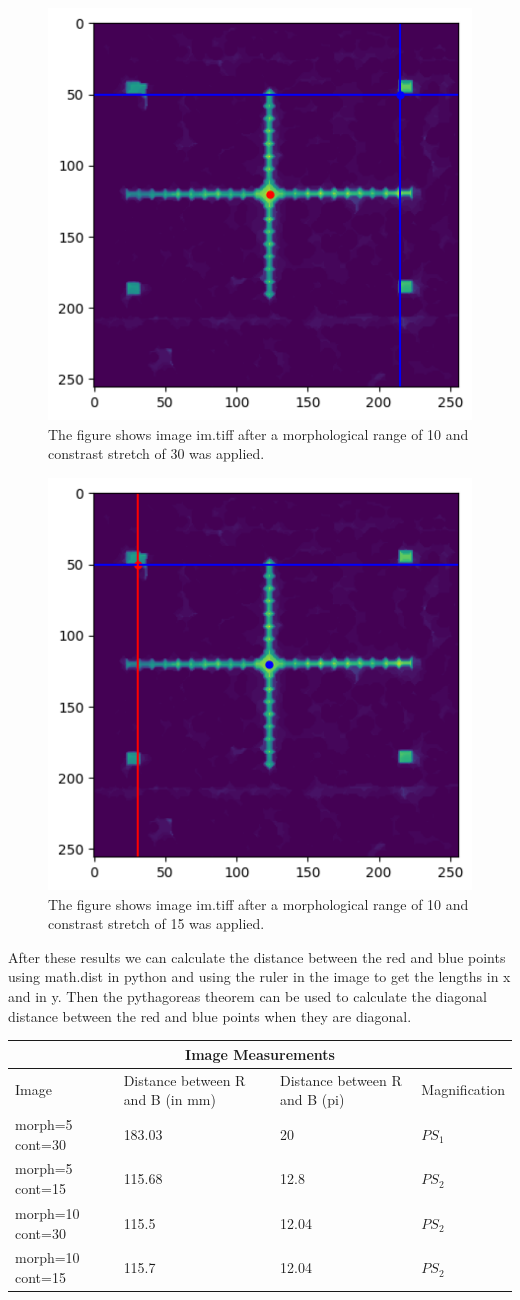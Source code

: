 \documentclass{article}
\begin{document}
\begin{figure}[h!]
\centering
\includegraphics[width=0.4\linewidth]{Images/image_3.png}
\caption{\label{fig:background_correction}The figure shows image {im.tiff} after a morphological range of 10 and constrast stretch of 30 was applied.}
\end{figure}

\begin{figure}[h!]
\centering
\includegraphics[width=0.4\linewidth]{Images/image_4.png}
\caption{\label{fig:background_correction}The figure shows image {im.tiff} after a morphological range of 10 and constrast stretch of 15 was applied.}
\end{figure}

After these results we can calculate the distance between the red and blue points using math.dist in python and using the ruler in the image to get the lengths in x and in y. Then the pythagoreas theorem can be used to calculate the diagonal distance between the red and blue points when they are diagonal. 

\begin{tabular}{ |p{3cm}||p{3cm}|p{3cm}|p{3cm}|  }
 \hline
 \multicolumn{4}{|c|}{Image Measurements} \\
 \hline
Image & Distance between R and B (in mm) &Distance between R and B (pi) & Magnification\\
 \hline 
 morph=5 cont=30 & 183.03  & 20 &  $PS_{1}$\\ 
 morph=5 cont=15  &  115.68 & 12.8  &  $PS_{2}$\\ 
 morph=10 cont=30 &  115.5 & 12.04 &  $PS_{2}$\\ 
 morph=10 cont=15 &  115.7 & 12.04 &  $PS_{2}$\\ 
 \hline
\end{tabular}
\end{document}
